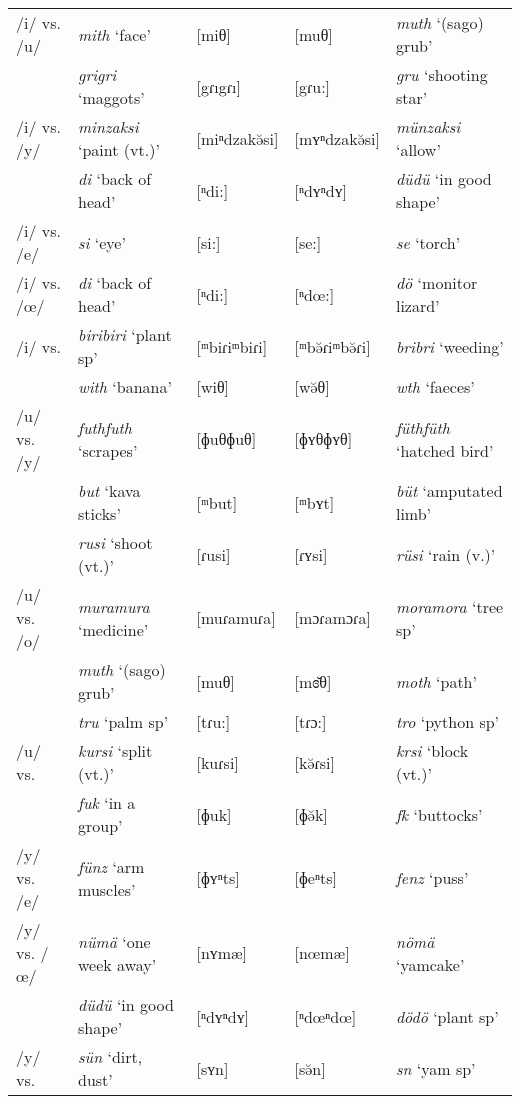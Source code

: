 \begin{longtable} {lllll}
	/i/ vs. /u/	&\emph{mith} `face'&[miθ]&[muθ]&\emph{muth} `(sago) grub'\\
				&\emph{grigri} `maggots'&[{\ᵑ}gɾı{\ᵑ}gɾı]&[{\ᵑ}gɾu:]&\emph{gru} `shooting star'\\
	/i/ vs. /y/	&\emph{minzaksi} `paint (vt.)'&[miⁿdzakə̆si]&[mʏⁿdzakə̆si]&\emph{münzaksi} `allow'\\
				&\emph{di} `back of head'&[ⁿdi:]&[ⁿdʏⁿdʏ]&\emph{düdü} `in good shape'\\
	/i/ vs. /e/	&\emph{si} `eye'&[si:]&[se:]&\emph{se} `torch'\\
	/i/ vs. /œ/	&\emph{di} `back of head'&[ⁿdi:]&[ⁿdœ:]&\emph{dö} `monitor lizard'\\
	/i/ vs. \Zero{}&\emph{biribiri} `plant sp'&[ᵐbiɾiᵐbiɾi]&[ᵐbə̆ɾiᵐbə̆ɾi]&\emph{bribri} `weeding'\\
				&\emph{with} `banana'&[wiθ]&[wə̆θ]&\emph{wth} `faeces'\\
	/u/ vs. /y/	&\emph{futhfuth} `scrapes'&[ɸuθɸuθ]&[ɸʏθɸʏθ]&\emph{füthfüth} `hatched bird'\\
				&\emph{but} `kava sticks'&[ᵐbut]&[ᵐbʏt]&\emph{büt} `amputated limb'\\
				&\emph{rusi} `shoot (vt.)'&[ɾusi]&[ɾʏsi]&\emph{rüsi} `rain (v.)'\\
	/u/ vs. /o/	&\emph{muramura} `medicine'&[muɾamuɾa]&[mɔɾamɔɾa]&\emph{moramora} `tree sp'\\
				&\emph{muth} `(sago) grub'&[muθ]&[mɞ̆θ]&\emph{moth} `path'\\
				&\emph{tru} `palm sp'&[tɾu:]&[tɾɔ:]&\emph{tro} `python sp'\\
	/u/ vs. \Zero{}&\emph{kursi} `split (vt.)'&[kuɾsi]&[kə̆ɾsi]&\emph{krsi} `block (vt.)'\\
				&\emph{fuk} `in a group'&[ɸuk]&[ɸə̆k]&\emph{fk} `buttocks'\\
	/y/ vs. /e/	&\emph{fünz} `arm muscles'&[ɸʏⁿts]&[ɸeⁿts]&\emph{fenz} `puss'\\
	/y/ vs. /œ/	&\emph{nümä} `one week away'&[nʏmæ]&[nœmæ]&\emph{nömä} `yamcake'\\
				&\emph{düdü} `in good shape'&[ⁿdʏⁿdʏ]&[ⁿdœⁿdœ]&\emph{dödö} `plant sp'\\
	/y/ vs. \Zero{}&\emph{sün} `dirt, dust'&[sʏn]&[sə̆n]&\emph{sn} `yam sp'\\

\end{longtable}

